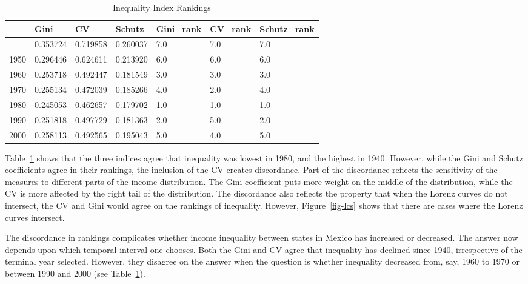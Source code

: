 \documentclass[
  a4paper, 
  twoside,
  final
]{article}
\begin{document}
\begin{longtable}[]{@{}lllllll@{}}

\caption{\label{tbl-rankings}Inequality Index Rankings}

\tabularnewline

\toprule\noalign{}
& Gini & CV & Schutz & Gini\_rank & CV\_rank & Schutz\_rank \\
\midrule\noalign{}
\endhead
\bottomrule\noalign{}
\endlastfoot
1940 & 0.353724 & 0.719858 & 0.260037 & 7.0 & 7.0 & 7.0 \\
1950 & 0.296446 & 0.624611 & 0.213920 & 6.0 & 6.0 & 6.0 \\
1960 & 0.253718 & 0.492447 & 0.181549 & 3.0 & 3.0 & 3.0 \\
1970 & 0.255134 & 0.472039 & 0.185266 & 4.0 & 2.0 & 4.0 \\
1980 & 0.245053 & 0.462657 & 0.179702 & 1.0 & 1.0 & 1.0 \\
1990 & 0.251818 & 0.497729 & 0.181363 & 2.0 & 5.0 & 2.0 \\
2000 & 0.258113 & 0.492565 & 0.195043 & 5.0 & 4.0 & 5.0 \\

\end{longtable}

Table~\ref{tbl-rankings} shows that the three indices agree that
inequality was lowest in 1980, and the highest in 1940. However, while
the Gini and Schutz coefficients agree in their rankings, the inclusion
of the CV creates discordance. Part of the discordance reflects the
sensitivity of the measures to different parts of the income
distribution. The Gini coefficient puts more weight on the middle of the
distribution, while the CV is more affected by the right tail of the
distribution. The discordance also reflects the property that when the
Lorenz curves do not intersect, the CV and Gini would agree on the
rankings of inequality. However, Figure~\ref{fig-lcs} shows that there
are cases where the Lorenz curves intersect.

The discordance in rankings complicates whether income inequality
between states in Mexico has increased or decreased. The answer now
depends upon which temporal interval one chooses. Both the Gini and CV
agree that inequality has declined since 1940, irrespective of the
terminal year selected. However, they disagree on the answer when the
question is whether inequality decreased from, say, 1960 to 1970 or
between 1990 and 2000 (see Table~\ref{tbl-rankings}).
\end{document}

